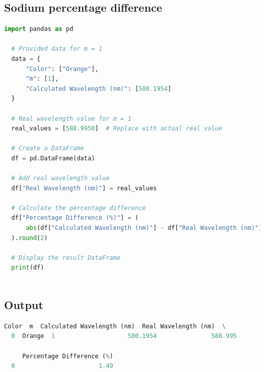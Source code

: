\documentclass[a4paper,11pt]{article}
\begin{document}
\newpage
%
\subsection*{Sodium percentage difference}
\begin{lstlisting}[language=Python]
  import pandas as pd

  # Provided data for m = 1
  data = {
      "Color": ["Orange"],
      "m": [1],
      "Calculated Wavelength (nm)": [580.1954]
  }
  
  # Real wavelength value for m = 1
  real_values = [588.9950]  # Replace with actual real value
  
  # Create a DataFrame
  df = pd.DataFrame(data)
  
  # Add real wavelength value
  df["Real Wavelength (nm)"] = real_values
  
  # Calculate the percentage difference
  df["Percentage Difference (%)"] = (
      abs(df["Calculated Wavelength (nm)"] - df["Real Wavelength (nm)"]) / df["Real Wavelength (nm)"] * 100
  ).round(2)
  
  # Display the result DataFrame
  print(df)
  
\end{lstlisting}
\subsection*{Output}
\begin{lstlisting}[language=Python]
  Color  m  Calculated Wavelength (nm)  Real Wavelength (nm)  \
  0  Orange  1                    580.1954               588.995   
  
     Percentage Difference (%)  
  0                       1.49
\end{lstlisting}
\end{document}
